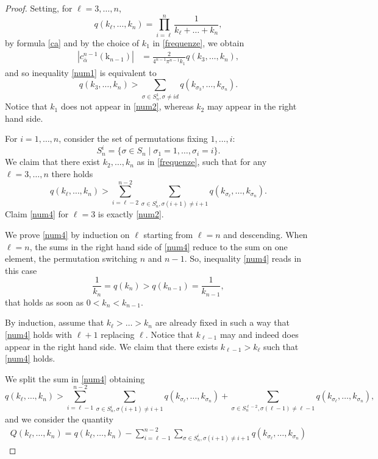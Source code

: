 \documentclass[12pt, reqno]{amsart}
\theoremstyle{plain}
\theoremstyle{definition}
\theoremstyle{remark}
\numberwithin{equation}{section}
\newcommand{\s}{\sigma}
\newcommand{\0}{\theta}
\renewcommand{\a}{\alpha}
\renewcommand{\k}{\kappa}
\newcommand{\1}{{-1}}
\renewcommand{\l}{\ell}
\renewcommand{\=}{\coloneqq}
\renewcommand{\.}{\dots}
\newcommand{\be}{\begin{equation}}
\newcommand{\ee}{\end{equation}}
\renewcommand{\k}{\mathrm k}
\begin{document}
 \begin{proof} Setting, for   $\l=3,\dots,n$,  
  \[
  q(k_\l,\.,k_n)=\prod_{i=\l}^n\frac{1}{k_\l+\.+k_n} ,
   \]
by formula \eqref{ca} and by the choice of $k_1$ in \eqref{frequenze}, we obtain
% 
  \[
  \begin{split}
 | c_{\bar\a}^{n-1}(\k_{n-1})| & 
 =\frac{2}{4^{n-1}\pi^{n-1} k_1}  q(k_3,\dots,k_n) ,  
 \end{split}
 \]
and so  inequality \eqref{num1} is equivalent to 
 \be
  \label{num2}
  q(k_3,\.,k_n)>\sum_{\s\in S_n^1, \s\neq id} q(k_{\s _3},\.,k_{\s_ n}). 
 \ee
Notice that $k_1$ does not appear in  \eqref{num2}, whereas $k_2$ may appear in the right hand side.


For $i=1,\dots,n$, consider the set of permutations fixing $1,\dots,i$:
 \[
  S_n^i=\{\s\in S_n\mid \s_1=1,\.,\s_ i=i\}.
 \]
 We claim that there exist $k_2,\dots, k_n$ as in \eqref{frequenze}, such that for any $\l=3,\dots, n$ there holds
  \be\label{num4}
  q(k_{\l},\.,k_n)>\sum_{i=\l-2}^{n-2}\sum_{\s\in S_n^i, \s(i+1)\neq i+1}  q(k_{\s _\l} ,\.,k_{\s _n}).
 \ee
Claim \eqref{num4} for $\l=3$ is exactly \eqref{num2}.
 
 
 We prove \eqref{num4} by induction on $\l$ starting from $\l=n$ and descending. When $\l=n$, the sums in the right hand side of \eqref{num4}
 reduce to the sum on one element, the permutation switching $n$ and $n-1$. So, inequality \eqref{num4} reads in this case
 \[
  \frac{1}{k_n}=q(k_n)>q(k_{n-1})=\frac{1}{k_{n-1}},
 \]
 that holds as soon as  $0<k_n<k_{n-1}$.
 
 
 By induction, assume that $k_{\l}>\dots>k_n$ are already fixed in such a way that \eqref{num4} holds with $\l+1$ replacing $\l$. Notice that $k_{\l-1}$ may and indeed does appear in the right hand side.
 We claim that there exists $k_{\l-1} > k_{\l}$ such that \eqref{num4} holds. 
 
 We split the sum in \eqref{num4}  obtaining
 \be
  \label{num5}
  q(k_{\l},\.,k_n)>\sum_{i=\l-1}^{n-2}\sum_{\s\in S_n^i, \s(i+1)\neq i+1} q(k_{\s _\l},\.,k_{\s_ n}) + 
  \sum_{\s\in S_n^{\l-2}, \s(\l-1)\neq \l-1}  q(k_{\s _\l},\.,k_{\s _n}),
 \ee
 and we consider the quantity
  \begin{align*}
  Q(k_\l,\dots,k_n) =  q(k_\l,\.,k_n)-\sum_{i=\l-1}^{n-2}\sum_{\s\in S_n^i, \s(i+1)\neq i+1}  q(k_{\s_ \l},\.,k_{\s_ n}) 
 \end{align*}
 

\end{proof}
\end{document}
